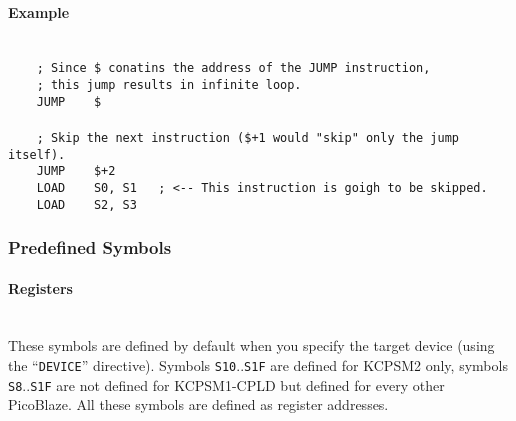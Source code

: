             \paragraph{Example}
                ~\\
                \verb'    ; Since $ conatins the address of the JUMP instruction,'\\
                \verb'    ; this jump results in infinite loop.'\\
                \verb'    JUMP    $'\\
                \verb''\\
                \verb'    ; Skip the next instruction ($+1 would "skip" only the jump itself).'\\
                \verb'    JUMP    $+2'\\
                \verb'    LOAD    S0, S1   ; <-- This instruction is goigh to be skipped.'\\
                \verb'    LOAD    S2, S3'

        \clearpage
        \subsubsection{Predefined Symbols}
            \paragraph{Registers}~\\
                These symbols are defined by default when you specify the target device (using the ``\texttt{DEVICE}'' directive). Symbols \texttt{S10}..\texttt{S1F} are defined for KCPSM2 only, symbols \texttt{S8}..\texttt{S1F} are not defined for KCPSM1-CPLD but defined for every other PicoBlaze. All these symbols are defined as register addresses.

